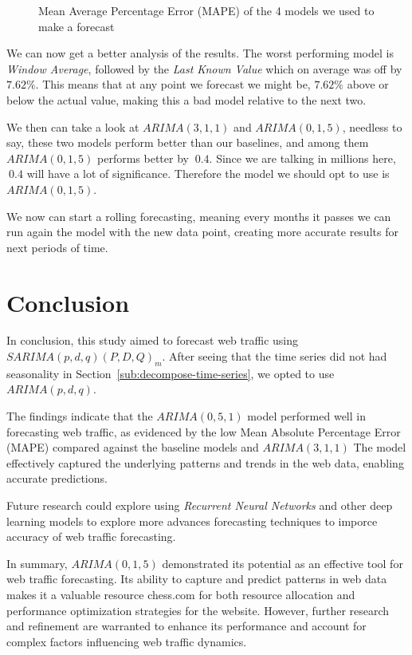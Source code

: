 \documentclass[journal]{IEEEtran}
\begin{document}
\begin{figure}[htbp]
  \centering
  
    \caption{Mean Average Percentage Error (MAPE) of the 4 models we used to
    make  a forecast} 
    \label{fig:mape}
\end{figure}

We can now get a better analysis of the results. The worst performing model is
\emph{Window Average}, followed by the \emph{Last Known Value} which on
average was off by $7.62\%$. This means that at any point we forecast we might
be, $7.62\%$ above or below the actual value, making this a bad model relative
to the next two.

We then can take a look at $ARIMA(3,1,1)$ and $ARIMA(0,1,5)$, needless to say,
these two models perform better than our baselines, and among them
$ARIMA(0,1,5)$ performs better by $~0.4$. Since we are talking in millions
here, $~0.4$ will have a lot of significance. Therefore the model we should
opt to use is $ARIMA(0,1,5)$.

We now can start a rolling forecasting, meaning every months it passes we can
run again the model with the new data point,  creating more accurate results
for next periods of time.

\section{Conclusion}\label{sec:conclusion}

In conclusion, this study aimed to forecast web traffic using
$SARIMA(p,d,q)(P,D,Q)_m$. After seeing that the time series did not had
seasonality in Section~\ref{sub:decompose-time-series}, we opted to use
$ARIMA(p,d,q)$.

The findings indicate that the $ARIMA(0,5,1)$ model performed well in
forecasting web traffic, as evidenced by the low Mean Absolute Percentage
Error (MAPE) compared against the baseline models and $ARIMA(3,1,1)$  The
model effectively captured the underlying patterns and trends in the web data,
enabling accurate predictions.

Future research could explore using \emph{Recurrent Neural Networks} and other
deep learning models to explore more advances forecasting techniques to
imporce accuracy of web traffic forecasting. 

In summary, $ARIMA(0,1,5)$ demonstrated its potential as an effective tool for
web traffic forecasting. Its ability to capture and predict patterns in web
data makes it a valuable resource chess.com for both resource allocation and
performance optimization strategies for the website. However, further research
and refinement are warranted to enhance its performance and account for
complex factors influencing web traffic dynamics.
\end{document}
